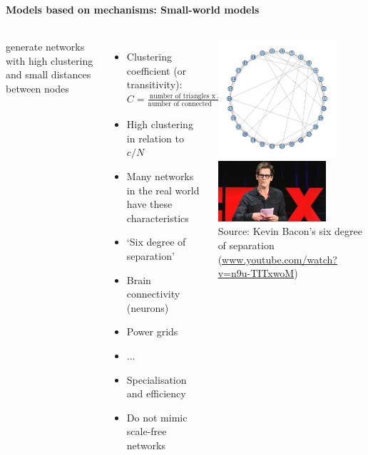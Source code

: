 \documentclass[8pt]{beamer}
\begin{document}
\begin{frame}
\frametitle{\insertsection}
\framesubtitle{Models based on mechanisms: Small-world models}

\begin{columns}
{\color{blue}{Small-world models}} generate networks with high clustering and small distances between nodes \cite{Watts1998} 

\begin{itemize}
\item Clustering coefficient (or transitivity): $C = \frac{\text{number of triangles x 3} }{\text{number of connected triples}}$
\item High clustering in relation to $c/N$
\item Many networks in the real world have these characteristics
\item `Six degree of separation'
\item Brain connectivity (neurons)
\item Power grids
\item ...
\item Specialisation and efficiency
\item Do not mimic scale-free networks
\end{itemize}

\centering
\includegraphics[width=0.8\textwidth]{sm} \\
\medskip
\includegraphics[width=4cm]{bacon}\\
\tiny{Source: Kevin Bacon's six degree of separation (\url{www.youtube.com/watch?v=n9u-TITxwoM})}
\end{columns}

\end{frame}
\end{document}
